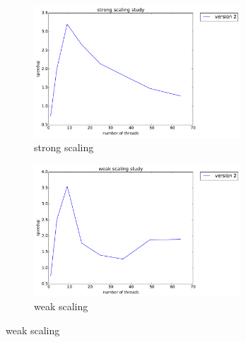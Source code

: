 \documentclass[12pt]{article}
\numberwithin{equation}{section}
\begin{document}
\begin{figure}[!ht]
   \begin{subfigure}
      \centering
        \begin{center}
      \includegraphics[width=0.85\textwidth] {plots/domain_strong}
        \end{center}
      \label{aload0}
      \caption{strong scaling}
  \end{subfigure}
  \begin{subfigure}
      \centering
        \begin{center}
      \includegraphics[width=0.85\textwidth] {plots/domain_weak}
        \end{center}
      \label{aload1}
      \caption{weak scaling}
  \end{subfigure}

\end{figure}
\end{document}
